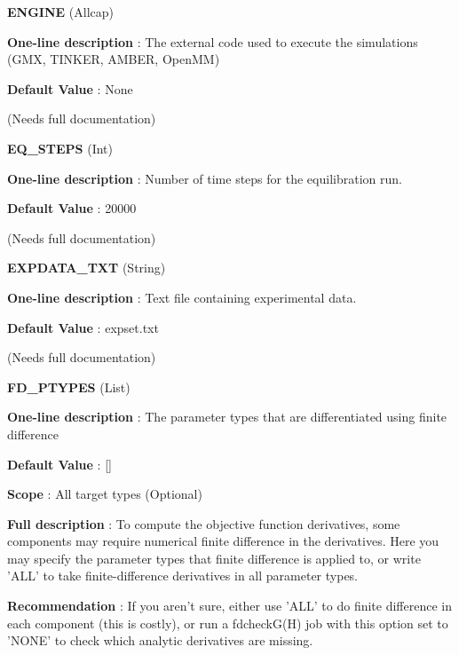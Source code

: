 \begin{DoxyItemize}
\item {\bfseries  E\-N\-G\-I\-N\-E } (Allcap) \par
{\bfseries  One-\/line description }\-: The external code used to execute the simulations (G\-M\-X, T\-I\-N\-K\-E\-R, A\-M\-B\-E\-R, Open\-M\-M) \par
{\bfseries  Default Value }\-: None \par
(Needs full documentation)\end{DoxyItemize}
\begin{DoxyItemize}
\item {\bfseries  E\-Q\-\_\-\-S\-T\-E\-P\-S } (Int) \par
{\bfseries  One-\/line description }\-: Number of time steps for the equilibration run. \par
{\bfseries  Default Value }\-: 20000 \par
(Needs full documentation)\end{DoxyItemize}
\begin{DoxyItemize}
\item {\bfseries  E\-X\-P\-D\-A\-T\-A\-\_\-\-T\-X\-T } (String) \par
{\bfseries  One-\/line description }\-: Text file containing experimental data. \par
{\bfseries  Default Value }\-: expset.\-txt \par
(Needs full documentation)\end{DoxyItemize}
\begin{DoxyItemize}
\item {\bfseries  F\-D\-\_\-\-P\-T\-Y\-P\-E\-S } (List) \par
{\bfseries  One-\/line description }\-: The parameter types that are differentiated using finite difference \par
{\bfseries  Default Value }\-: \mbox{[}\mbox{]} \par
{\bfseries  Scope }\-: All target types (Optional) \par
{\bfseries  Full description }\-: To compute the objective function derivatives, some components may require numerical finite difference in the derivatives. Here you may specify the parameter types that finite difference is applied to, or write 'A\-L\-L' to take finite-\/difference derivatives in all parameter types. \par
{\bfseries  Recommendation }\-: If you aren't sure, either use 'A\-L\-L' to do finite difference in each component (this is costly), or run a fdcheck\-G(\-H) job with this option set to 'N\-O\-N\-E' to check which analytic derivatives are missing.\end{DoxyItemize}
